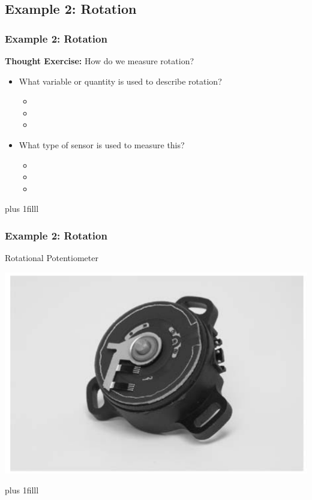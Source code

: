 \documentclass[fleqn]{beamer} %
\newcommand{\sectionIsubsectionIVtitle}{Example 2: Rotation}
\newcommand{\btVFill}{\vskip0pt plus 1filll}
\begin{document}
		\subsection{\sectionIsubsectionIVtitle}\label{sectionIsubsectionIV}	

			\begin{frame}
				\frametitle{\sectionIsubsectionIVtitle}

					{\bf Thought Exercise:} How do we measure {\BL rotation}?        
	
					\begin{itemize}
					
						\item What variable or quantity is used to describe {\BL rotation}?                         
						\begin{itemize}
							\item
							\item
							\item	
						\end{itemize} \vspace{5mm}
						\item What type of sensor is used to measure this?
						\begin{itemize}
							\item
							\item
							\item	
						\end{itemize}	

					\end{itemize}
				
				\btVFill

				
			\end{frame}

			\begin{frame}
				\frametitle{\sectionIsubsectionIVtitle}
				
				Rotational Potentiometer 

				\includegraphics[scale=.25]{images/rot_pot.png}


				\btVFill

			\end{frame}
\end{document}
